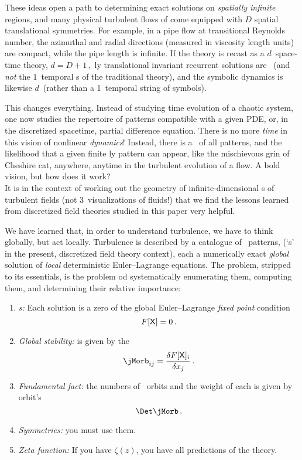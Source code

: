 These ideas open a path to determining exact solutions on \emph{spatially
infinite} regions, and many physical turbulent flows of come equipped
with $D$ spatial translational symmetries. For example, in a pipe flow at
transitional Reynolds number, the azimuthal and radial directions
(measured in viscosity length units) are compact, while the pipe length
is infinite. If the theory is recast as a $d$\dmn\ space-time theory,
\(d= D +1\,,\)
{\spt}ly translational invariant recurrent solutions are \dtors\
(and \emph{not} the $1$\dmn\ temporal \po s of the traditional {\po} theory),
and the symbolic dynamics is likewise $d$\dmn\
(rather than a 1\dmn\ temporal string of symbols).

This changes everything. Instead of studying time evolution of a chaotic
system, one now studies the repertoire of {\spt} patterns compatible with
a given PDE, or, in the discretized spacetime, partial difference
equation. There is no more \emph{time} in this vision of nonlinear
\emph{dynamics}! Instead, there is a \statesp\ of all {\spt} patterns,
and the likelihood that a given finite {\spt}ly pattern can appear, like
the mischievous grin of Cheshire cat, anywhere, anytime in the turbulent
evolution of a flow. A bold vision, but how does it work?
\\

It is in the context of working out the geometry of infinite-dimensional
{\statesp}s of turbulent fields (not 3\dmn\ visualizations of
fluids!) that we find the lessons learned from discretized field
theories studied in this paper very helpful.

We have learned that, in order to understand turbulence, we have to think
globally, but act locally. Turbulence is described by a catalogue of
\spt\ patterns, ({`{\lattstate}s'} in the present, discretized field theory
context), each a numerically exact \emph{global} solution of \emph{local}
deterministic Euler–Lagrange equations. The problem, stripped to its
essentials, is the problem od systematically enumerating them, computing
them, and determining their relative importance:

\begin{enumerate}
              \item
\emph{{\Lattstate}s:} Each solution is a zero of
the global Euler–Lagrange {\em fixed point} condition
\[
F[\mathsf{X}] = 0
\,.
\]
              \item
{\em Global stability:} is given by the {\jacobianOrb}
\[
\jMorb_{ij} =\frac{\delta F[\Xx]_i}{\delta \ssp_j}
\,.
\]
              \item
{\em Fundamental fact:} the numbers of \spt\ orbits
and the weight of each is given by orbit's {\HillDet}
\[
\Det\jMorb
\,.
\]
              \item
{\em Symmetries:} you must use them.
              \item
{\em Zeta function:} If you have $\zeta(z)$,
you have all predictions of the theory.
            \end{enumerate}


